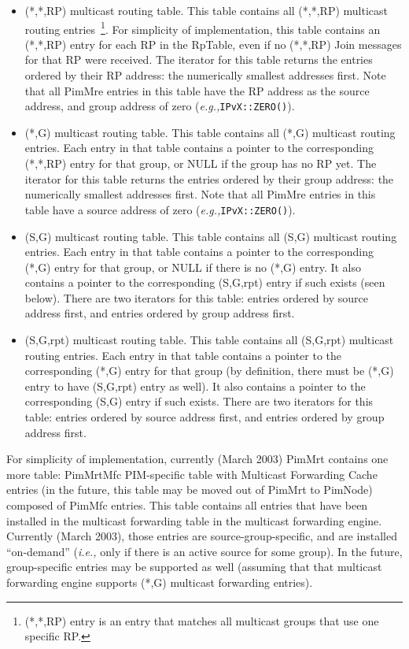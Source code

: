 \documentclass[11pt]{article}
\newcommand{\ie}{\emph{i.e.,}\xspace}
\newcommand{\eg}{\emph{e.g.,}\xspace}
\begin{document}
\begin{itemize}

  \item (*,*,RP) multicast routing table. This table contains all
  (*,*,RP) multicast routing entries~\footnote{(*,*,RP) entry is an
  entry that matches all multicast groups that use one specific
  RP.}. For simplicity of implementation, this table contains an
  (*,*,RP) entry for each RP in the RpTable, even if no (*,*,RP) Join
  messages for that RP were received.  The iterator for this table
  returns the entries ordered by their RP address: the numerically
  smallest addresses first. Note that all PimMre entries in this table
  have the RP address as the source address, and group address of zero
  (\eg \verb=IPvX::ZERO()=).

  \item (*,G) multicast routing table. This table contains all (*,G)
  multicast routing entries. Each entry in that table contains a pointer
  to the corresponding (*,*,RP) entry for that group, or NULL if the
  group has no RP yet. The iterator for this table returns the entries
  ordered by their group address: the numerically smallest addresses
  first. Note that all PimMre entries in this table have a source
  address of zero (\eg \verb=IPvX::ZERO()=).

  \item (S,G) multicast routing table. This table contains all (S,G)
  multicast routing entries. Each entry in that table contains a pointer
  to the corresponding (*,G) entry for that group, or NULL if there is
  no (*,G) entry. It also contains a pointer to the corresponding
  (S,G,rpt) entry if such exists (seen below). There are two iterators
  for this table: entries ordered by source address first, and entries
  ordered by group address first.

  \item (S,G,rpt) multicast routing table. This table contains all
  (S,G,rpt) multicast routing entries. Each entry in that table contains
  a pointer to the corresponding (*,G) entry for that group (by
  definition, there must be (*,G) entry to have (S,G,rpt) entry as
  well).  It also contains a pointer to the corresponding (S,G) entry if
  such exists. There are two iterators for this table: entries ordered
  by source address first, and entries ordered by group address first.

\end{itemize}

For simplicity of implementation, currently (March 2003) PimMrt
contains one more table: PimMrtMfc PIM-specific table with Multicast
Forwarding Cache entries (in the future, this table may be moved out of
PimMrt to PimNode) composed of PimMfc entries. This table contains all
entries that have been installed in the multicast forwarding table in
the multicast forwarding engine. Currently (March 2003), those
entries are source-group-specific, and are installed ``on-demand'' (\ie
only if there is an active source for some group). In the future,
group-specific entries may be supported as well (assuming that that
multicast forwarding engine supports (*,G) multicast forwarding
entries).
\end{document}
